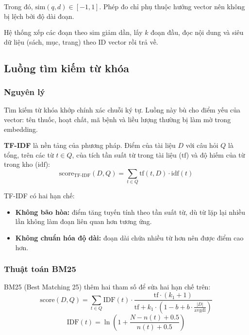 Trong đó, $\mathrm{sim}(q,d)\in[-1,1]$. Phép đo chỉ phụ thuộc hướng vector nên không bị lệch bởi độ dài đoạn.

Hệ thống xếp các đoạn theo $\mathrm{sim}$ giảm dần, lấy $k$ đoạn đầu, đọc nội dung và siêu dữ liệu (sách, mục, trang) theo ID vector rồi trả về.

\subsection{Luồng tìm kiếm từ khóa}

\subsubsection{Nguyên lý}

Tìm kiếm từ khóa khớp chính xác chuỗi ký tự. Luồng này bù cho điểm yếu của vector: tên thuốc, hoạt chất, mã bệnh và liều lượng thường bị làm mờ trong embedding.

\textbf{TF-IDF} là nền tảng của phương pháp. Điểm của tài liệu $D$ với câu hỏi $Q$ là tổng, trên các từ $t\in Q$, của tích tần suất từ trong tài liệu ($\mathrm{tf}$) và độ hiếm của từ trong kho ($\mathrm{idf}$):
\begin{equation}
  \mathrm{score}_{\mathrm{TF\text{-}IDF}}(D,Q)=\sum _{t\in Q} \mathrm{tf}(t,D)\cdot \mathrm{idf}(t)
\end{equation}

TF-IDF có hai hạn chế:
\begin{itemize}
  \item \textbf{Không bão hòa:} điểm tăng tuyến tính theo tần suất từ, dù từ lặp lại nhiều lần không làm đoạn liên quan hơn tương ứng.
  \item \textbf{Không chuẩn hóa độ dài:} đoạn dài chứa nhiều từ hơn nên được điểm cao hơn.
\end{itemize}

\subsubsection{Thuật toán BM25}

BM25 (Best Matching 25) thêm hai tham số để sửa hai hạn chế trên:
\begin{equation}
  \mathrm{score}(D,Q)=\sum_{t\in Q}\mathrm{IDF}(t)\cdot\frac{\mathrm{tf}\cdot(k_1+1)}{\mathrm{tf}+k_1\cdot\left(1-b+b\cdot\frac{|D|}{\mathrm{avgdl}}\right)}
\end{equation}
\begin{equation}
  \mathrm{IDF}(t)=\ln\left( 1+\frac{N-n(t)+0.5}{n(t)+0.5}\right)
\end{equation}

